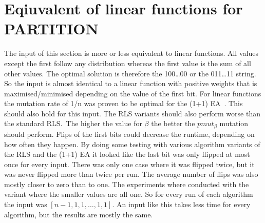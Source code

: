 \section{Eqiuvalent of linear functions for PARTITION}\label{evalSec:onemax}
The input of this section is more or less equivalent to linear functions. All values except the first follow any distribution whereas the first value is the sum of all other values.
The optimal solution is therefore the 100\dots00 or the 011\dots11 string.
So the input is almost identical to a linear function with positive weights that is maximised/minimised depending on the value of the first bit.\newline
For linear functions the mutation rate of 1/n was proven to be optimal for the (1+1) EA~\cite{witt2013tight}.
This should also hold for this input.
The RLS variants should also perform worse than the standard RLS.\
The higher the value for $\beta$ the better the $pmut_\beta$ mutation should perform.
Flips of the first bits could decrease the runtime, depending on how often they happen.
By doing some testing with various algorithm variants of the RLS and the (1+1) EA it looked like the last bit was only flipped at most once for every input.
There was only one case where it was flipped twice, but it was never flipped more than twice per run.
The average number of flips was also mostly closer to zero than to one.\newline
The experiments where conducted with the variant where the smaller values are all one.
So for every run of each algorithm the input was $[n-1, 1, 1, \dots, 1, 1]$.
An input like this takes less time for every algorithm, but the results are mostly the same.
